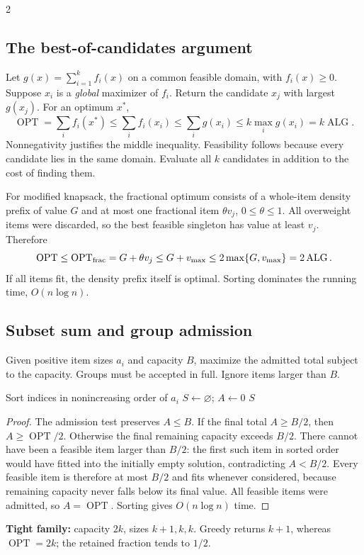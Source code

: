 \documentclass[10pt]{article}
\theoremstyle{definition}
\newcommand{\OPT}{\operatorname{OPT}}
\newcommand{\ALG}{\operatorname{ALG}}
\begin{document}
\begin{multicols*}{2}
\subsection{The best-of-candidates argument}
\label{gre:best}
Let $g(x)=\sum_{i=1}^k f_i(x)$ on a common feasible domain, with $f_i(x)\ge0$.
Suppose $x_i$ is a \emph{global} maximizer of $f_i$. Return the candidate $x_j$ with
largest $g(x_j)$. For an optimum $x^*$,
\[
\OPT=\sum_i f_i(x^*)\le\sum_i f_i(x_i)
\le\sum_i g(x_i)\le k\max_i g(x_i)=k\ALG.
\]
Nonnegativity justifies the middle inequality. Feasibility follows because every candidate
lies in the same domain. Evaluate all $k$ candidates in addition to the cost of finding them.

For modified knapsack, the fractional optimum consists of a whole-item density prefix
of value $G$ and at most one fractional item $\theta v_j$, $0\le\theta\le1$. All overweight
items were discarded, so the best feasible singleton has value at least $v_j$. Therefore
\[
\OPT\le\OPT_{\rm frac}=G+\theta v_j\le G+v_{\max}
\le2\max\{G,v_{\max}\}=2\ALG.
\]
If all items fit, the density prefix itself is optimal. Sorting dominates the running time,
$O(n\log n)$.

\subsection{Subset sum and group admission}
\label{gre:subset}
Given positive item sizes $a_i$ and capacity $B$, maximize the admitted total subject to
the capacity. Groups must be accepted in full. Ignore items larger than $B$.

\begin{algorithm}[H]
\caption{Largest-first admission}
Sort indices in nonincreasing order of $a_i$\;
$S\gets\varnothing$; $A\gets0$\;
\Return $S$\;
\end{algorithm}
\begin{proof}
The admission test preserves $A\le B$. If the final total $A\ge B/2$, then
$A\ge\OPT/2$. Otherwise the final remaining capacity exceeds $B/2$.
There cannot have been a feasible item larger than $B/2$: the first such item in sorted
order would have fitted into the initially empty solution, contradicting $A<B/2$.
Every feasible item is therefore at most $B/2$ and fits whenever considered, because
remaining capacity never falls below its final value. All feasible items were admitted,
so $A=\OPT$. Sorting gives $O(n\log n)$ time.
\end{proof}
\textbf{Tight family:} capacity $2k$, sizes $k+1,k,k$. Greedy returns $k+1$, whereas
$\OPT=2k$; the retained fraction tends to $1/2$.


\end{multicols*}
\end{document}
